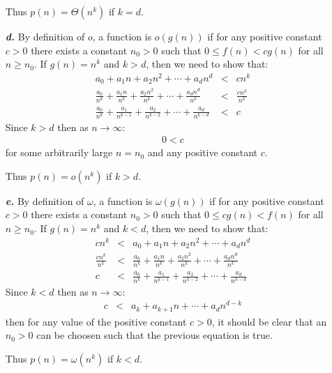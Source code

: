 \documentclass{article}
\begin{document}
\begin{enumerate}
		Thus $p(n) = \Theta(n^k)$ if $k = d$.
	\item[\textbf{\textit{d.}}] By definition of $o$, a function is $o(g(n))$ if for any positive constant $c > 0$ there exists a constant $n_0 > 0$ such that $0 \leq f(n) < c g(n)$ for all $n \geq n_0$. If $g(n) = n^k$ and $k > d$, then we need to show that:
		\begin{eqnarray*}
			a_0 + a_1 n + a_2 n^2 + \cdots + a_d n^d & < & c n^k \\
			\frac{a_0}{n^k} + \frac{a_1 n}{n^k} + \frac{a_2 n^2}{n^k} + \cdots + \frac{a_d n^d}{n^k} & < & \frac{c n^k}{n^k} \\
			\frac{a_0}{n^k} + \frac{a_1}{n^{k-1}} + \frac{a_2}{n^{k-2}} + \cdots + \frac{a_d}{n^{k-d}} & < & c
		\end{eqnarray*}
		Since $k > d$ then as $n \rightarrow \infty$:
		\begin{eqnarray*}
			0 < c
		\end{eqnarray*}
		for some arbitrarily large $n = n_0$ and any positive constant $c$.

		Thus $p(n) = o(n^k)$ if $k > d$.
	\item[\textbf{\textit{e.}}] By definition of $\omega$, a function is $\omega(g(n))$ if for any positive constant $c > 0$ there exists a constant $n_0 > 0$ such that $0 \leq c g(n) < f(n)$ for all $n \geq n_0$. If $g(n) = n^k$ and $k < d$, then we need to show that:
		\begin{eqnarray*}
			c n^k & < & a_0 + a_1 n + a_2 n^2 + \cdots + a_d n^d \\
			\frac{c n^k}{n^k} & < & \frac{a_0}{n^k} + \frac{a_1 n}{n^k} + \frac{a_2 n^2}{n^k} + \cdots + \frac{a_d n^d}{n^k} \\
			c & < & \frac{a_0}{n^k} + \frac{a_1}{n^{k-1}} + \frac{a_2}{n^{k-2}} + \cdots + \frac{a_d}{n^{k-d}}
		\end{eqnarray*}
		Since $k < d$ then as $n \rightarrow \infty$:
		\begin{eqnarray*}
			c & < & a_k + a_{k+1} n + \cdots + a_d n^{d-k}
		\end{eqnarray*}
		then for any value of the positive constant $c > 0$, it should be clear that an $n_0 > 0$ can be choosen such that the previous equation is true.

		Thus $p(n) = \omega(n^k)$ if $k < d$.
\end{enumerate}
\end{document}
